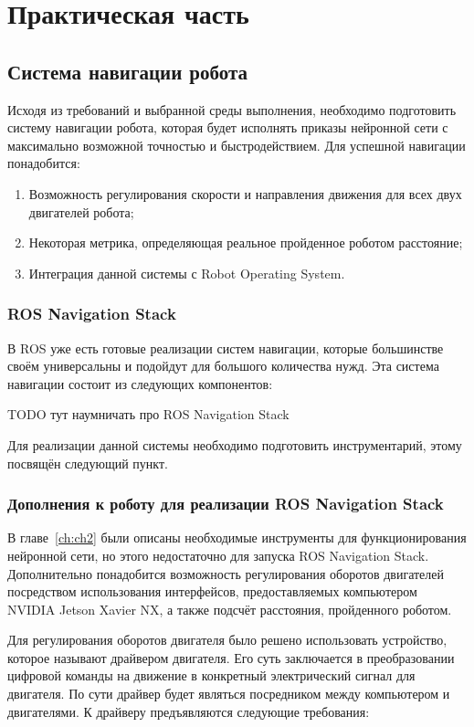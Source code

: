 \chapter{Практическая часть}\label{ch:ch3}

\section{Система навигации робота}\label{sec:ch3/sect1}
Исходя из требований и выбранной среды выполнения, необходимо подготовить систему навигации робота, которая будет исполнять приказы нейронной сети с максимально возможной точностью и быстродействием. Для успешной навигации понадобится:
\begin{enumerate}[beginpenalty=10000] %
  \item Возможность регулирования скорости и направления движения для всех двух двигателей робота;
  \item Некоторая метрика, определяющая реальное пройденное роботом расстояние;
  \item Интеграция данной системы с Robot Operating System.
\end{enumerate}

\subsection{ROS Navigation Stack}
В ROS уже есть готовые реализации систем навигации, которые большинстве своём универсальны и подойдут для большого количества нужд. Эта система навигации состоит из следующих компонентов:

TODO тут наумничать про ROS Navigation Stack

Для реализации данной системы необходимо подготовить инструментарий, этому посвящён следующий пункт.

\subsection{Дополнения к роботу для реализации ROS Navigation Stack}
В главе~\cref{ch:ch2} были описаны необходимые инструменты для функционирования нейронной сети, но этого недостаточно для запуска ROS Navigation Stack. Дополнительно понадобится возможность регулирования оборотов двигателей посредством использования интерфейсов, предоставляемых компьютером NVIDIA Jetson Xavier NX, а также подсчёт расстояния, пройденного роботом. 

Для регулирования оборотов двигателя было решено использовать устройство, которое называют драйвером двигателя. Его суть заключается в преобразовании цифровой команды на движение в конкретный электрический сигнал для двигателя. По сути драйвер будет являться посредником между компьютером и двигателями. К драйверу предъявляются следующие требования:

